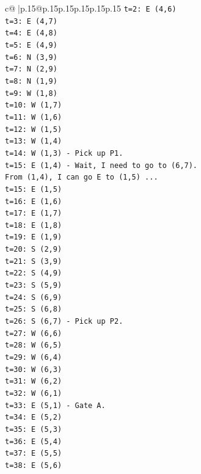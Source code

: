 \documentclass{article}
\begin{document}
{\begin{supertabular}{c@{$\;$}|p{.15\linewidth}@{}p{.15\linewidth}p{.15\linewidth}p{.15\linewidth}p{.15\linewidth}p{.15\linewidth}}
{{{\texttt{t=2: E (4,6)} \\
\texttt{t=3: E (4,7)} \\
\texttt{t=4: E (4,8)} \\
\texttt{t=5: E (4,9)} \\
\texttt{t=6: N (3,9)} \\
\texttt{t=7: N (2,9)} \\
\texttt{t=8: N (1,9)} \\
\texttt{t=9: W (1,8)} \\
\texttt{t=10: W (1,7)} \\
\texttt{t=11: W (1,6)} \\
\texttt{t=12: W (1,5)} \\
\texttt{t=13: W (1,4)} \\
\texttt{t=14: W (1,3) {-} Pick up P1.} \\
\texttt{t=15: E (1,4) {-} Wait, I need to go to (6,7).} \\
\texttt{From (1,4), I can go E to (1,5) ...} \\
\texttt{t=15: E (1,5)} \\
\texttt{t=16: E (1,6)} \\
\texttt{t=17: E (1,7)} \\
\texttt{t=18: E (1,8)} \\
\texttt{t=19: E (1,9)} \\
\texttt{t=20: S (2,9)} \\
\texttt{t=21: S (3,9)} \\
\texttt{t=22: S (4,9)} \\
\texttt{t=23: S (5,9)} \\
\texttt{t=24: S (6,9)} \\
\texttt{t=25: S (6,8)} \\
\texttt{t=26: S (6,7) {-} Pick up P2.} \\
\texttt{t=27: W (6,6)} \\
\texttt{t=28: W (6,5)} \\
\texttt{t=29: W (6,4)} \\
\texttt{t=30: W (6,3)} \\
\texttt{t=31: W (6,2)} \\
\texttt{t=32: W (6,1)} \\
\texttt{t=33: E (5,1) {-} Gate A.} \\
\texttt{t=34: E (5,2)} \\
\texttt{t=35: E (5,3)} \\
\texttt{t=36: E (5,4)} \\
\texttt{t=37: E (5,5)} \\
\texttt{t=38: E (5,6)} \\
}}}
\end{supertabular}}
\end{document}
